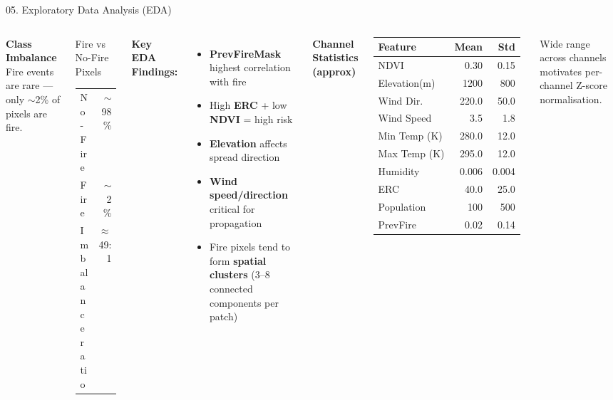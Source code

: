 ﻿\documentclass[aspectratio=169,t]{beamer}
\begin{document}
\begin{frame}{05. Exploratory Data Analysis (EDA)}
\begin{columns}[t]
\textcolor{accent}{\textbf{Class Imbalance}}\\[0.1cm]
\small Fire events are rare --- only $\sim$2\% of pixels are fire.
\vspace{0.15cm}
\begin{block}{Fire vs No-Fire Pixels}
\begin{tabular}{lr}
No-Fire & $\sim$98\% \\
Fire    & $\sim$2\%  \\
Imbalance ratio & $\approx$49:1 \\
\end{tabular}
\end{block}
\vspace{0.2cm}
\textcolor{accentgreen}{\textbf{Key EDA Findings:}}
\begin{itemize}
  \item \textbf{PrevFireMask} highest correlation with fire
  \item High \textbf{ERC} + low \textbf{NDVI} = high risk
  \item \textbf{Elevation} affects spread direction
  \item \textbf{Wind speed/direction} critical for propagation
  \item Fire pixels tend to form \textbf{spatial clusters} (3--8 connected components per patch)
\end{itemize}
\textcolor{accent}{\textbf{Channel Statistics (approx)}}\\[0.1cm]
\small
\begin{tabular}{lrr}
\toprule
\textcolor{accent}{Feature} & \textcolor{accent}{Mean} & \textcolor{accent}{Std} \\
\midrule
NDVI         & 0.30  & 0.15 \\
Elevation(m) & 1200  & 800  \\
Wind Dir.    & 220.0 & 50.0 \\
Wind Speed   & 3.5   & 1.8  \\
Min Temp (K) & 280.0 & 12.0 \\
Max Temp (K) & 295.0 & 12.0 \\
Humidity     & 0.006 & 0.004 \\
ERC          & 40.0  & 25.0 \\
Population   & 100   & 500  \\
PrevFire     & 0.02  & 0.14 \\
\bottomrule
\end{tabular}
\vspace{0.1cm}
\textcolor{textsecondary}{\tiny Wide range across channels motivates per-channel Z-score normalisation.}
\end{columns}
\end{frame}
\end{document}

